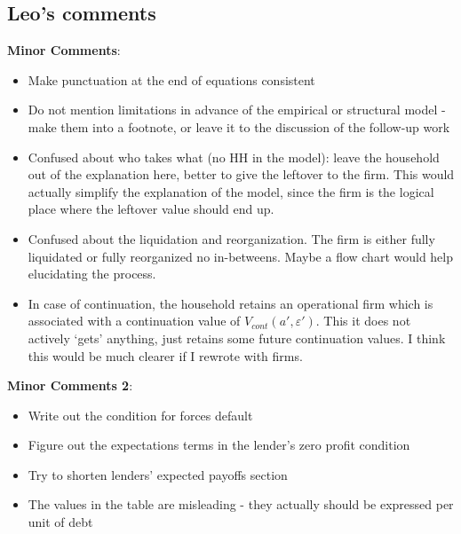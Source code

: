 \documentclass[12pt]{article}
\begin{document}
\subsection*{Leo's comments}
\textbf{Minor Comments}:
\begin{itemize}\setlength\itemsep{0em} \small
    \item Make punctuation at the end of equations consistent
    \item Do not mention limitations in advance of the empirical or structural model - make them into a footnote, or leave it to the discussion of the follow-up work
    \item Confused about who takes what (no HH in the model):  leave the household out of the explanation here, better to give the leftover to the firm. This would actually simplify the explanation of the model, since the firm is the logical place where the leftover value should end up.
    \item Confused about the liquidation and reorganization. The firm is either fully liquidated or fully reorganized no in-betweens. Maybe a flow chart would help elucidating the process. 
    \item In case of continuation, the household retains an operational firm which is associated with a continuation value of $V_{cont}(a',\varepsilon')$. This it does not actively `gets' anything, just retains some future continuation values. I think this would be much clearer if I rewrote with firms. 
\end{itemize} \normalsize
\textbf{Minor Comments 2}:
\begin{itemize}\setlength\itemsep{0em} \small
    \item Write out the condition for forces default
    \item Figure out the expectations terms in the lender's zero profit condition
    \item Try to shorten lenders' expected payoffs section
    \item The values in the table are misleading - they actually should be expressed per unit of debt
\end{itemize} \normalsize
\end{document}
